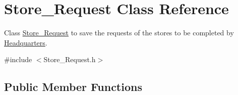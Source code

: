 \hypertarget{class_store___request}{}\section{Store\+\_\+\+Request Class Reference}
\label{class_store___request}


Class \hyperlink{class_store___request}{Store\+\_\+\+Request} to save the requests of the stores to be completed by \hyperlink{class_headquarters}{Headquarters}.  




{\ttfamily \#include $<$Store\+\_\+\+Request.\+h$>$}

\subsection*{Public Member Functions}
